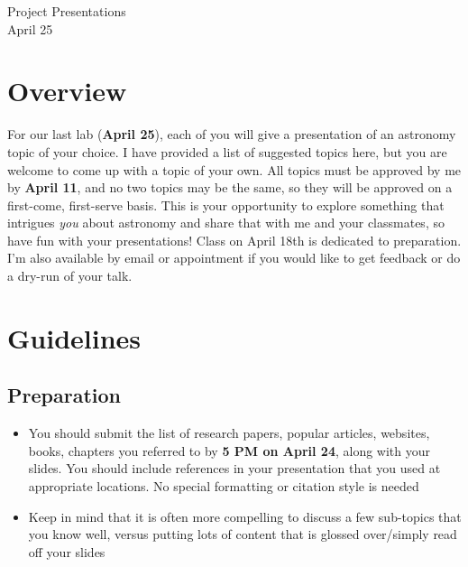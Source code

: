 \documentclass[11pt]{article}
\begin{document}
\begin{center}
\huge{Project Presentations}\\ \medskip \Large{April 25}
\end{center}

\section{Overview}
For our last lab (\textbf{April 25}), each of you will give a presentation of an astronomy topic of your choice.  I have provided a list of suggested topics here, but you are welcome to come up with a topic of your own.  All topics must be approved by me by \textbf{April 11}, and no two topics may be the same, so they will be approved on a first-come, first-serve basis.  This is your opportunity to explore something that intrigues \textit{you} about astronomy and share that with me and your classmates, so have fun with your presentations!  Class on April 18th is dedicated to preparation. I'm also available by email or appointment if you would like to get feedback or do a dry-run of your talk.

\section{Guidelines}
\subsection*{Preparation}
\begin{itemize}
    \item You should submit the list of research papers, popular articles, websites, books, chapters you referred to by \textbf{5 PM on April 24}, along with your slides. You should include references in your presentation that you used at appropriate locations. No special formatting or citation style is needed
    \item Keep in mind that it is often more compelling to discuss a few sub-topics that you know well, versus putting lots of content that is glossed over/simply read off your slides
\end{itemize}
\end{document}
